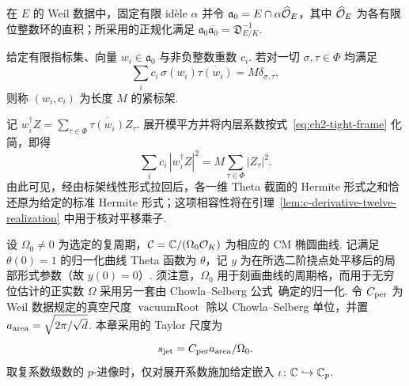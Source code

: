 在 $E$ 的 Weil 数据中，固定有限 idèle $\alpha$ 并令 $\mathfrak a_0=E\cap\alpha\widehat{\mathcal{O}}_E$，其中 $\widehat{\mathcal{O}}_E$ 为各有限位整数环的直积；所采用的正规化满足 $\mathfrak a_0\overline{\mathfrak a_0}=\mathfrak D_{E/K}^{-1}$.

\begin{definition}[紧标架]
\label{def:ch2-tight-frame}
\emitthmsource
给定有限指标集、向量 $w_i\in\mathfrak a_0$ 与非负整数重数 $c_i$. 若对一切 $\sigma,\tau\in\Phi$ 均满足
\begin{equation}
\label{eq:ch2-tight-frame}
 \sum_i c_i\,\sigma(w_i)\overline{\tau(w_i)}=M\delta_{\sigma,\tau},
\end{equation}
则称 $(w_i,c_i)$ 为长度 $M$ 的紧标架.
\end{definition}

记 $w_i^\dagger Z=\sum_{\tau\in\Phi}\overline{\tau(w_i)}Z_\tau$. 展开模平方并将内层系数按式~\eqref{eq:ch2-tight-frame} 化简，即得
\begin{equation}
\label{eq:ch2-tight-frame-norm}
 \sum_i c_i\,|w_i^\dagger Z|^2=M\sum_{\tau\in\Phi}|Z_\tau|^2.
\end{equation}
由此可见，经由标架线性形式拉回后，各一维 Theta 截面的 Hermite 形式之和恰还原为给定的标准 Hermite 形式；这项相容性将在引理~\ref{lem:c-derivative-twelve-realization} 中用于核对平移乘子.

设 $\Omega_0\ne0$ 为选定的复周期，$\mathcal C=\mathbb{C}/(\Omega_0\mathcal{O}_K)$ 为相应的 CM 椭圆曲线. 记满足 $\theta(0)=1$ 的归一化曲线 Theta 函数为 $\theta$，记 $y$ 为在所选二阶挠点处平移后的局部形式参数（故 $y(0)=0$）. 须注意，$\Omega_0$ 用于刻画曲线的周期格，而用于无穷位估计的正实数 $\Omega$ 采用另一套由 Chowla--Selberg 公式~\cite{SelbergChowla1967}确定的归一化. 令 $C_{\rm per}$ 为 Weil 数据规定的真空尺度 $\operatorname{vacuumRoot}$ 除以 Chowla--Selberg 单位，并置 $a_{\rm area}=\sqrt{2\pi/\sqrt d}$. 本章采用的 Taylor 尺度为
\begin{equation}
\label{eq:ch2-jet-scale}
 s_{\rm jet}=C_{\rm per}a_{\rm area}/\Omega_0.
\end{equation}
取复系数级数的 $p$-进像时，仅对展开系数施加给定嵌入 $\iota\colon\mathbb{C}\hookrightarrow\mathbb{C}_p$.

